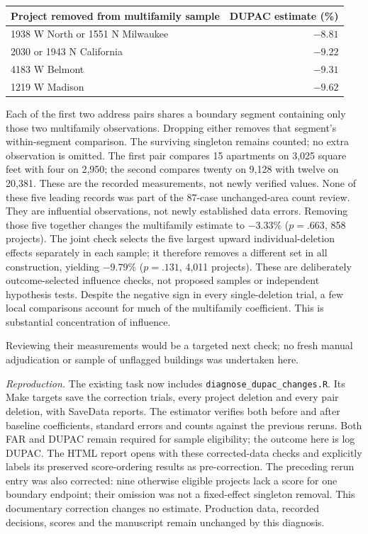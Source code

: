 \begin{center}
\begin{tabular}{lr}
\hline
Project removed from multifamily sample & DUPAC estimate (\%) \\
\hline
1938 W North or 1551 N Milwaukee & $-8.81$ \\
2030 or 1943 N California & $-9.22$ \\
4183 W Belmont & $-9.31$ \\
1219 W Madison & $-9.62$ \\
\hline
\end{tabular}
\end{center}

Each of the first two address pairs shares a boundary segment containing only
those two multifamily observations. Dropping either removes that segment's
within-segment comparison. The surviving singleton remains counted; no extra
observation is omitted. The first pair compares 15 apartments on 3,025 square
feet with four on 2,950; the second compares twenty on 9,128 with twelve on
20,381. These are the recorded measurements, not newly verified values. None
of these five leading records was part of the 87-case unchanged-area count
review. They are influential observations, not newly established data errors.
Removing those five together changes the multifamily estimate to $-3.33\%$
($p=.663$, 858 projects). The joint check selects the five largest upward
individual-deletion effects separately in each sample; it therefore removes
a different set in all construction, yielding $-9.79\%$ ($p=.131$,
4,011 projects). These are deliberately outcome-selected influence checks,
not proposed samples or independent hypothesis tests. Despite the negative
sign in every single-deletion trial, a few local comparisons account for much
of the multifamily coefficient. This is substantial concentration of influence.

Reviewing their measurements would be a targeted next check; no fresh manual
adjudication or sample of unflagged buildings was undertaken here.

\textit{Reproduction.} The existing
 task now includes
\texttt{diagnose\_dupac\_changes.R}. Its Make targets save the correction trials,
every project deletion and every pair deletion, with SaveData reports. The
estimator verifies both before and after baseline coefficients, standard errors
and counts against the previous reruns. Both FAR and DUPAC remain required for
sample eligibility; the outcome here is log DUPAC. The HTML report opens with
these corrected-data checks and explicitly labels its preserved score-ordering
results as pre-correction. The preceding rerun entry was also corrected: nine
otherwise eligible projects lack a score for one boundary endpoint; their
omission was not a fixed-effect singleton removal. This documentary correction
changes no estimate. Production data, recorded decisions, scores and the
manuscript remain unchanged by this diagnosis.


